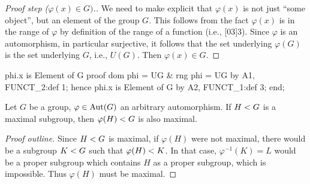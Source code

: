 \begin{proof}[Proof step ($\varphi(x)\in G)$.]
We need to make explicit that $\varphi(x)$ is not just ``some object'',
but an element of the group $G$. This follows from the fact $\varphi(x)$
is in the range of $\varphi$ by definition of the range of a function
(i.e., [03]{3}). Since $\varphi$ is
an automorphism, in particular surjective, it follows that the set
underlying $\varphi(G)$ is the set underlying $G$, i.e., $U(G)$.
Then $\varphi(x)\in G$.
\end{proof}

\nwenddocs{}\endmoddef\nwstartdeflinemarkup{}\nwenddeflinemarkup
phi.x is Element of G
proof
  dom phi = UG & rng phi = UG by A1, FUNCT_2:def 1;
  hence phi.x is Element of G by A2, FUNCT_1:def 3;
end;
\nwendcode{}\nwdocspar

\begin{theorem}\label{thm:characteristic:automorphism:image-of-maximal-subgroup-under-automorphism-is-maximal}
  Let $G$ be a group, $\varphi\in\operatorname{Aut}(G)$ an arbitrary automorphism.
  If $H< G$ is a maximal subgroup, then
  $\varphi(H)< G$ is also maximal.
\end{theorem}

\begin{proof}[Proof outline]
  Since $H< G$ is maximal, if $\varphi(H)$ were not
  maximal, there would be a subgroup $K< G$ such that
  $\varphi(H)< K$. In that case, $\varphi^{-1}(K)=L$ would
  be a proper subgroup which contains $H$ as a proper subgroup, which is
  impossible. Thus $\varphi(H)$ must be maximal.
\end{proof}

